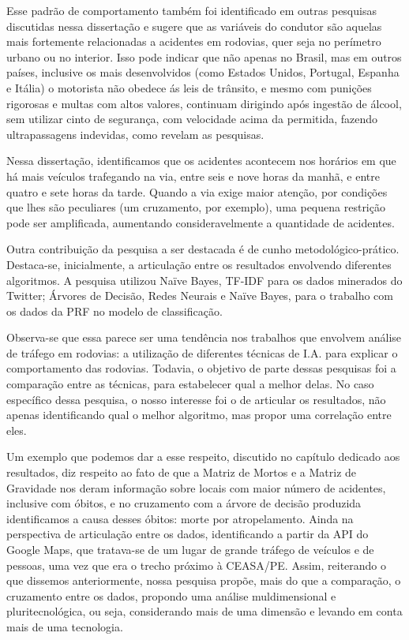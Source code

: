 Esse padrão de comportamento também foi identificado em outras pesquisas discutidas nessa dissertação e sugere que as variáveis do condutor são aquelas mais fortemente relacionadas a acidentes em rodovias, quer seja no perímetro urbano ou no interior. Isso pode indicar que não apenas no Brasil, mas em outros países, inclusive os mais desenvolvidos (como Estados Unidos, Portugal, Espanha e Itália) o motorista não obedece ás leis de trânsito, e mesmo com punições rigorosas e multas com altos valores, continuam dirigindo após ingestão de álcool, sem utilizar cinto de segurança, com velocidade acima da permitida, fazendo ultrapassagens indevidas, como revelam as pesquisas.
 
Nessa dissertação, identificamos que os acidentes acontecem nos horários em que há mais veículos trafegando na via, entre seis e nove horas da manhã, e entre quatro e sete horas da tarde. Quando a via exige maior atenção, por condições que lhes são peculiares (um cruzamento, por exemplo), uma pequena restrição pode ser amplificada, aumentando consideravelmente a quantidade de acidentes.

Outra contribuição da pesquisa a ser destacada é de cunho metodológico-prático. Destaca-se, inicialmente, a articulação entre os resultados envolvendo diferentes algoritmos. A pesquisa utilizou Naïve Bayes, TF-IDF para os dados minerados do Twitter; 
Árvores de Decisão, Redes Neurais e  Naïve Bayes, para o trabalho com os dados da PRF no modelo de classificação.

Observa-se que essa parece ser uma tendência nos trabalhos que envolvem análise de tráfego em rodovias: a utilização de diferentes técnicas de I.A. para explicar o comportamento das rodovias. Todavia, o objetivo de parte dessas pesquisas foi a comparação entre as técnicas, para estabelecer qual a melhor delas. No caso específico dessa pesquisa, o nosso interesse foi o de articular os resultados, não apenas identificando qual o melhor algoritmo, mas propor uma correlação entre eles.

Um exemplo que podemos dar a esse respeito, discutido no capítulo dedicado aos resultados, diz respeito ao fato de que a Matriz de Mortos e a Matriz de Gravidade nos deram informação sobre locais com maior número de acidentes, inclusive com óbitos, e no cruzamento com a árvore de decisão produzida identificamos a causa desses óbitos: morte por atropelamento. Ainda na perspectiva de articulação entre os dados, identificando a partir da API do Google Maps, que tratava-se de um lugar de grande tráfego de veículos e de pessoas, uma vez que era o trecho próximo à CEASA/PE. Assim, reiterando o que dissemos anteriormente, nossa pesquisa propõe, mais do que a comparação, o cruzamento entre os dados, propondo uma análise muldimensional e pluritecnológica, ou seja, considerando mais de uma dimensão e levando em conta mais de uma tecnologia. 

